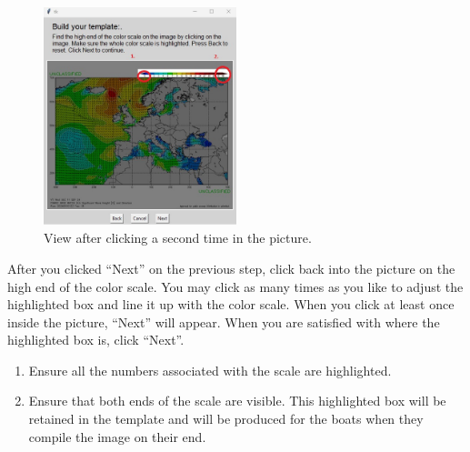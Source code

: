 \newpage
\begin{figure}[H]
    \centering\includegraphics[width=0.5\textwidth]{TeX/Build_Template3.jpg}
    \caption{View after clicking a second time in the picture.}
\end{figure}
After you clicked ``Next'' on the previous step, click back into the picture on the high end of the color scale. You may click as many times as you like to adjust the highlighted box and line it up with the color scale. When you click at least once inside the picture, ``Next'' will appear. When you  are satisfied with where the highlighted box is, click ``Next''.
\begin{enumerate}
    \item Ensure all the numbers associated with the scale are highlighted.
    \item Ensure that both ends of the scale are visible. This highlighted box will be retained in the template and will be produced for the boats when they compile the image on their end.
\end{enumerate}

